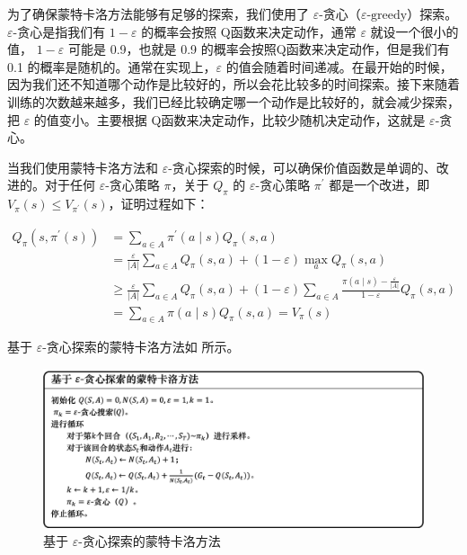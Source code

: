 为了确保蒙特卡洛方法能够有足够的探索，我们使用了 $\varepsilon$-贪心（$\varepsilon\text{-greedy}$）探索。
$\varepsilon$-贪心是指我们有 $1-\varepsilon$ 的概率会按照 Q函数来决定动作，通常 $\varepsilon$ 就设一个很小的值， $1-\varepsilon$ 可能是 0.9，也就是 0.9 的概率会按照Q函数来决定动作，但是我们有 0.1 的概率是随机的。通常在实现上，$\varepsilon$ 的值会随着时间递减。在最开始的时候，因为我们还不知道哪个动作是比较好的，所以会花比较多的时间探索。接下来随着训练的次数越来越多，我们已经比较确定哪一个动作是比较好的，就会减少探索，把 $\varepsilon$ 的值变小。主要根据 Q函数来决定动作，比较少随机决定动作，这就是 $\varepsilon$-贪心。


当我们使用蒙特卡洛方法和 $\varepsilon$-贪心探索的时候，可以确保价值函数是单调的、改进的。对于任何 $\varepsilon$-贪心策略 $\pi$，关于 $Q_{\pi}$ 的 $\varepsilon$-贪心策略 $\pi^{\prime}$ 都是一个改进，即 $V_{\pi}(s) \leqslant V_{\pi^{\prime}}(s)$，证明过程如下：

\begin{equation}
	\label{eq:monotone}
	\begin{aligned}
		Q_{\pi}\left(s, \pi^{\prime}(s)\right) &=\sum_{a \in A} \pi^{\prime}(a \mid s) Q_{\pi}(s, a) \\
		&=\frac{\varepsilon}{|A|} \sum_{a \in A} Q_{\pi}(s, a)+(1-\varepsilon) \max _{a} Q_{\pi}(s, a) \\
		& \geqslant \frac{\varepsilon}{|A|} \sum_{a \in A} Q_{\pi}(s, a)+(1-\varepsilon) \sum_{a \in A} \frac{\pi(a \mid s)-\frac{\varepsilon}{|A|}}{1-\varepsilon} Q_{\pi}(s, a) \\
		&=\sum_{a \in A} \pi(a \mid s) Q_{\pi}(s, a)=V_{\pi}(s)
		\end{aligned}
\end{equation}


基于 $\varepsilon$-贪心探索的蒙特卡洛方法如 所示。

\begin{figure}[htb]
	\centering
	\includegraphics[width=0.5\linewidth]{res/ch3/model_free_control_7}
	\caption{基于 $\varepsilon$-贪心探索的蒙特卡洛方法}
	\label{fig:MC_greedy_pseudocode}
\end{figure}

